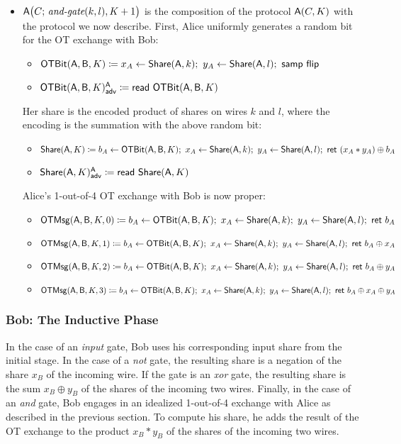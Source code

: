 \begin{itemize}
\begin{itemize}
\end{itemize}
\item $\mathsf{A}\big(C; \, \textit{and-gate}(k,l),K+1\big)$ is the composition of the protocol $\mathsf{A}(C,K)$ with the protocol we now describe. First, Alice uniformly generates a random bit for the OT exchange with Bob:
\begin{itemize}
\item $\OTBit(\A,\B,K) \coloneqq x_A \leftarrow \Share(\A,k); \ y_A \leftarrow \Share(\A,l); \ \samp{\flip}$
\item {\color{blue} $\mathsf{OTBit}(\mathsf{A},\mathsf{B},K)^{\mathsf{A}}_{\mathsf{adv}} \coloneqq \mathsf{read} \ \mathsf{OTBit}(\mathsf{A},\mathsf{B},K)$}
\end{itemize}
Her share is the encoded product of shares on wires $k$ and $l$, where the encoding is the summation with the above random bit:
\begin{itemize}
\item $\mathsf{Share}(\mathsf{A},K) \coloneqq b_A \leftarrow \mathsf{OTBit}(\mathsf{A},\mathsf{B},K); \ x_A \leftarrow \mathsf{Share}(\mathsf{A},k); \ y_A \leftarrow \mathsf{Share}(\mathsf{A},l); \ \mathsf{ret} \ (x_A * y_A) \oplus b_A$
\item {\color{blue} $\mathsf{Share}(\mathsf{A},K)^{\mathsf{A}}_{\mathsf{adv}} \coloneqq \mathsf{read} \ \mathsf{Share}(\mathsf{A},K)$}
\end{itemize}
Alice's 1-out-of-4 OT exchange with Bob is now proper:
\begin{itemize}
\item $\mathsf{OTMsg}(\mathsf{A},\mathsf{B},K,0) \coloneqq b_A \leftarrow \mathsf{OTBit}(\mathsf{A},\mathsf{B},K); \ x_A \leftarrow \mathsf{Share}(\mathsf{A},k); \ y_A \leftarrow \mathsf{Share}(\mathsf{A},l); \ \mathsf{ret} \ b_A$
\item $\mathsf{OTMsg}(\mathsf{A},\mathsf{B},K,1) \coloneqq b_A \leftarrow \mathsf{OTBit}(\mathsf{A},\mathsf{B},K); \ x_A \leftarrow \mathsf{Share}(\mathsf{A},k); \ y_A \leftarrow \mathsf{Share}(\mathsf{A},l); \ \mathsf{ret} \ b_A \oplus x_A$
\item $\mathsf{OTMsg}(\mathsf{A},\mathsf{B},K,2) \coloneqq b_A \leftarrow \mathsf{OTBit}(\mathsf{A},\mathsf{B},K); \ x_A \leftarrow \mathsf{Share}(\mathsf{A},k); \ y_A \leftarrow \mathsf{Share}(\mathsf{A},l); \ \mathsf{ret} \ b_A \oplus y_A$
\item $\mathsf{OTMsg}(\mathsf{A},\mathsf{B},K,3) \coloneqq b_A \leftarrow \mathsf{OTBit}(\mathsf{A},\mathsf{B},K); \ x_A \leftarrow \mathsf{Share}(\mathsf{A},k); \ y_A \leftarrow \mathsf{Share}(\mathsf{A},l); \ \mathsf{ret} \ b_A \oplus x_A \oplus y_A$
\end{itemize}
\end{itemize}

\subsubsection{Bob: The Inductive Phase}
In the case of an \emph{input} gate, Bob uses his corresponding input share from the initial stage. In the case of a \emph{not} gate, the resulting share is a negation of the share $x_B$ of the incoming wire. If the gate is an \emph{xor} gate, the resulting share is the sum $x_B \oplus y_B$ of the shares of the incoming two wires. Finally, in the case of an \emph{and} gate, Bob engages in an idealized 1-out-of-4 exchange with Alice as described in the previous section. To compute his share, he adds the result of the OT exchange to the product $x_B * y_B$ of the shares of the incoming two wires.

